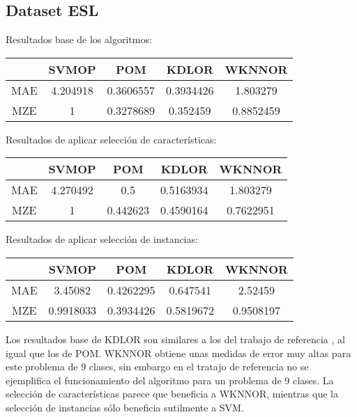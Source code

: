 \subsection{Dataset ESL}
Resultados base de los algoritmos:
\begin{center}
\begin{tabular}{ c c c c c }
	& SVMOP & POM & KDLOR & WKNNOR  \\
	\hline	
	MAE &   4.204918  & 0.3606557 &	0.3934426 &  1.803279  \\
	MZE &	1         & 0.3278689 & 0.352459 & 0.8852459  \\
	\hline  
\end{tabular}
\end{center}
\vspace{20pt}
Resultados de aplicar selección de características:
\begin{center}
\begin{tabular}{ c c c c c }
	& SVMOP & POM & KDLOR & WKNNOR  \\
	\hline	
	MAE &   4.270492  & 0.5      & 0.5163934 &  1.803279  \\
	MZE &	1         & 0.442623 & 0.4590164 & 0.7622951  \\
	\hline  
\end{tabular}
\end{center}
\vspace{20pt}
Resultados de aplicar selección de instancias:
\begin{center}
\begin{tabular}{ c c c c c }
	& SVMOP & POM & KDLOR & WKNNOR  \\
	\hline	
	MAE &   3.45082  & 0.4262295 & 0.647541 &  2.52459  \\
	MZE &	0.9918033 & 0.3934426 & 0.5819672 & 0.9508197  \\
	\hline  
\end{tabular}
\end{center}

Los resultados base de KDLOR son similares a los del trabajo de referencia \cite{Gutiérrez2016}, al igual que los de POM. WKNNOR obtiene unas medidas de error muy altas para este problema de 9 clases, sin embargo en el tratajo de referencia \cite{duivesteijn2008nearest} no se ejemplifica el funcionamiento del algoritmo para un problema de 9 clases. La selección de características parece que beneficia a WKNNOR, mientras que la selección de instancias sólo beneficia sutilmente a SVM.


